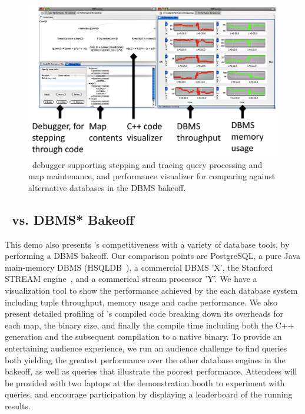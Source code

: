 \begin{figure}[tb]
\begin{center}
\includegraphics[scale=0.088]{figures/dbt-gui2}
\end{center}

\vspace{-4mm}

\caption{\compiler\ debugger supporting stepping and tracing query processing and
map maintenance, and performance visualizer for comparing against alternative
databases in the DBMS bakeoff.}
\label{fig:debugperfgui}
\end{figure}

\subsection{\compiler\ vs. DBMS* Bakeoff}
This demo also presents \compiler's competitiveness with a variety of database
tools, by performing a DBMS bakeoff. Our comparison points are PostgreSQL, a pure
Java main-memory DBMS (HSQLDB~\cite{hsqldb-url}), a commercial DBMS 'X', the
Stanford STREAM engine~\cite{motwani-cidr:03}, and a commerical stream processor
'Y'. We have a visualization tool to show the performance achieved by the each
database system including tuple throughput, memory usage and cache performance.
We also present detailed profiling of \compiler's compiled code breaking down its
overheads for each map, the binary size, and finally the compile time including
both the C++ generation and the subsequent compilation to a native binary. To
provide an entertaining audience experience, we run an audience challenge to find
queries both yielding the greatest performance over the other database engines in
the bakeoff, as well as queries that illustrate the poorest performance.
Attendees will be provided with two laptops at the demonstration booth to
experiment with queries, and encourage participation by displaying a leaderboard
of the running results.

